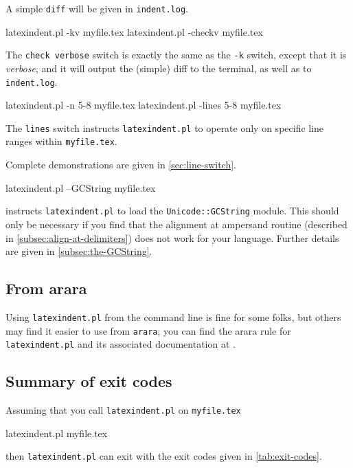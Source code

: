 	A simple \texttt{diff} will be given in \texttt{indent.log}.

	\begin{commandshell}
latexindent.pl -kv myfile.tex
latexindent.pl -checkv myfile.tex
\end{commandshell}
	 The \texttt{check verbose}
	switch is exactly the same as the \texttt{-k} switch, except that it is \emph{verbose},
	and it will output the (simple) diff to the terminal, as well as to \texttt{indent.log}.

	\begin{commandshell}
latexindent.pl -n 5-8 myfile.tex
latexindent.pl -lines 5-8 myfile.tex
\end{commandshell}
	 The \texttt{lines} switch instructs
	\texttt{latexindent.pl} to operate only on specific line ranges within
	\texttt{myfile.tex}.

	Complete demonstrations are given in \cref{sec:line-switch}.

	\begin{commandshell}
latexindent.pl --GCString myfile.tex
\end{commandshell}
	 instructs \texttt{latexindent.pl} to load the
	\texttt{Unicode::GCString} module. This should only be necessary if you find that the
	alignment at ampersand routine (described in \cref{subsec:align-at-delimiters}) does not
	work for your language. Further details are given in \cref{subsec:the-GCString}.

\subsection{From arara}\label{sec:arara}
	Using \texttt{latexindent.pl} from the command line is fine for some folks, but others
	may find it easier to use from \texttt{arara}; you can find the arara rule for
	\texttt{latexindent.pl} and its associated documentation at \cite{paulo}.

\subsection{Summary of exit codes}
	Assuming that you call \texttt{latexindent.pl} on \texttt{myfile.tex}
	\begin{commandshell}
latexindent.pl myfile.tex
\end{commandshell}
	then \texttt{latexindent.pl} can exit with the exit codes given in \cref{tab:exit-codes}.

